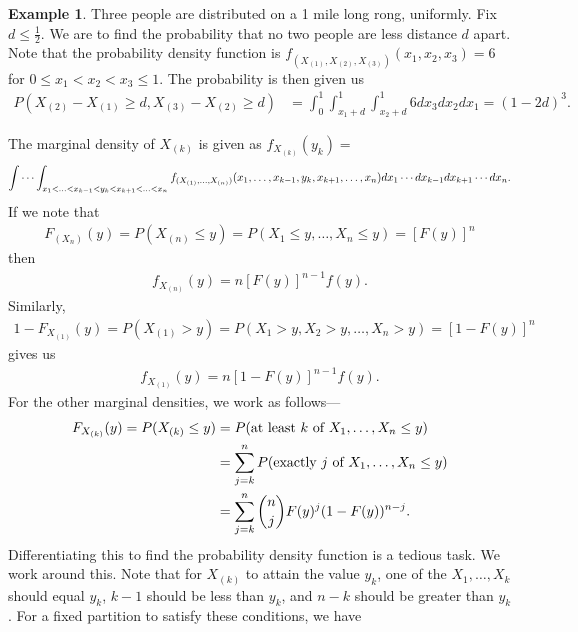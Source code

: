 \documentclass[15pt,a4paper]{book}
\theoremstyle{definition}
\newtheorem{example}[theorem]{Example}
\begin{document}
\begin{example}
    Three people are distributed on a 1 mile long rong, uniformly. Fix $d \leq \frac{1}{2}$. We are to find the probability that no two people are less distance $d$ apart. Note that the probability density function is $f_{(X_{(1)},X_{(2)},X_{(3)})}(x_{1},x_{2},x_{3}) = 6$ for $0 \leq x_{1} < x_{2} < x_{3} \leq 1$. The probability is then given us
    \begin{align}
        P(X_{(2)}-X_{(1)} \geq d, X_{(3)} - X_{(2)} \geq d) &= \int_{0}^{1} \int_{x_{1}+d}^{1} \int_{x_{2}+d}^{1} 6 dx_{3} dx_{2} dx_{1} = (1-2d)^{3}.
    \end{align}
\end{example}
The marginal density of $X_{(k)}$ is given as $f_{X_{(k)}}(y_{k}) = $
\begin{align}
    \idotsint_{x_{1} < \ldots < x_{k-1} < y_{k} < x_{k+1} < \ldots < x_{n}} f_{(X_{(1)},\ldots,X_{(n)})}(x_{1},\ldots,x_{k-1},y_{k},x_{k+1},\ldots,x_{n}) dx_{1} \cdots dx_{k-1} dx_{k+1} \cdots dx_{n}.
\end{align}
If we note that
\begin{align}
    F_{(X_{n})}(y) = P(X_{(n)} \leq y) = P(X_{1}\leq y, \ldots, X_{n} \leq y) = [F(y)]^{n}
\end{align}
then
\begin{align}
    f_{X_{(n)}}(y) = n[F(y)]^{n-1} f(y).
\end{align}
Similarly,
\begin{align}
    1-F_{X_{(1)}}(y) = P(X_{(1)} > y) = P(X_{1} > y, X_{2} > y, \ldots, X_{n} > y) = [1-F(y)]^{n}
\end{align}
gives us
\begin{align}
    f_{X_{(1)}}(y) = n[1-F(y)]^{n-1}f(y).
\end{align}
For the other marginal densities, we work as follows---
\begin{align}
    F_{X_{(k)}}(y) = P(X_{(k)}\leq y) &= P(\text{at least $k$ of }X_{1},\ldots,X_{n} \leq y) \notag \\
    &= \sum_{j=k}^{n} P(\text{exactly $j$ of }X_{1},\ldots,X_{n} \leq y) \notag \\
    &= \sum_{j=k}^{n} \binom{n}{j} F(y)^{j} (1-F(y))^{n-j}.
\end{align}
Differentiating this to find the probability density function is a tedious task. We work around this. Note that for $X_{(k)}$ to attain the value $y_k$, one of the $X_{1},\ldots,X_{k}$ should equal $y_{k}$, $k-1$ should be less than $y_{k}$, and $n-k$ should be greater than $y_{k}$. For a fixed partition to satisfy these conditions, we have
\end{document}
